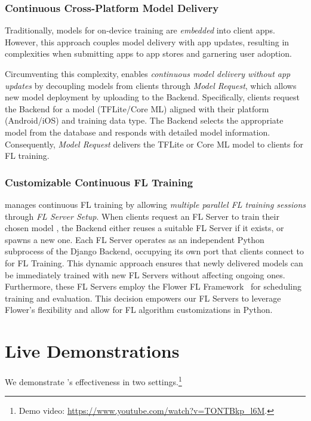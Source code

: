 \documentclass[conference]{IEEEtran}
\begin{document}
\subsubsection{Continuous Cross-Platform Model Delivery}
Traditionally, models for on-device training are \textit{embedded} into client apps.
However, this approach couples model delivery with app updates,
resulting in complexities when submitting apps to app stores and garnering user adoption.

Circumventing this complexity,
\FedKit{} enables \textit{continuous model delivery without app updates} by
decoupling models from clients through \textit{Model Request},
which allows new model deployment by uploading to the Backend.
Specifically, clients request the Backend for a model (TFLite/Core ML)
aligned with
their platform (Android/iOS) and training data type.
The Backend selects the appropriate model \model{} from the database and
responds with detailed model information.
Consequently, \textit{Model Request} delivers the TFLite or Core ML model
to clients for FL training.

\subsubsection{Customizable Continuous FL Training}
\FedKit{} manages continuous FL training by allowing \textit{multiple parallel FL training sessions}
through \textit{FL Server Setup}.
When clients request an FL Server to
train their chosen model \model{},
the Backend either reuses a suitable FL Server \fs{} if it exists,
or spawns a new one.
Each FL Server
operates as an independent Python subprocess of the Django Backend,
occupying its own port that
clients connect to for FL Training.
This dynamic approach ensures that
newly delivered models can be immediately trained with new FL Servers
without affecting ongoing ones.
Furthermore,
these FL Servers employ the Flower FL Framework~\cite{mathur2021ondevice} for
scheduling training and evaluation.
This decision empowers our FL Servers to leverage Flower's flexibility and
allow for FL algorithm customizations in Python.

\section{Live Demonstrations}

We demonstrate \FedKit{}'s effectiveness in two settings.\footnote{
    Demo video: \url{https://www.youtube.com/watch?v=TONTBkp_l6M}.
}
\end{document}
